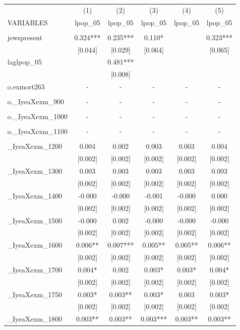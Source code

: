 \documentclass[landscape]{article}
\begin{document}
\begin{tabular}{lccccc} \hline
 & (1) & (2) & (3) & (4) & (5) \\
VARIABLES & lpop\_05 & lpop\_05 & lpop\_05 & lpop\_05 & lpop\_05 \\ \hline
 &  &  &  &  &  \\
jewspresent & 0.324*** & 0.235*** & 0.110* &  & 0.323*** \\
 & [0.044] & [0.029] & [0.064] &  & [0.065] \\
laglpop\_05 &  & 0.481*** &  &  &  \\
 &  & [0.008] &  &  &  \\
o.exmort263 & - & - & - & - & - \\
 &  &  &  &  &  \\
o.\_IyeaXexm\_900 & - & - & - & - & - \\
 &  &  &  &  &  \\
o.\_IyeaXexm\_1000 & - & - & - & - & - \\
 &  &  &  &  &  \\
o.\_IyeaXexm\_1100 & - & - & - & - & - \\
 &  &  &  &  &  \\
\_IyeaXexm\_1200 & 0.004 & 0.002 & 0.003 & 0.003 & 0.004 \\
 & [0.002] & [0.002] & [0.002] & [0.002] & [0.002] \\
\_IyeaXexm\_1300 & 0.003 & 0.003 & 0.003 & 0.003 & 0.003 \\
 & [0.002] & [0.002] & [0.002] & [0.002] & [0.002] \\
\_IyeaXexm\_1400 & -0.000 & -0.000 & -0.001 & -0.000 & 0.000 \\
 & [0.002] & [0.002] & [0.002] & [0.002] & [0.002] \\
\_IyeaXexm\_1500 & -0.000 & 0.002 & -0.000 & -0.000 & -0.000 \\
 & [0.002] & [0.002] & [0.002] & [0.002] & [0.002] \\
\_IyeaXexm\_1600 & 0.006** & 0.007*** & 0.005** & 0.005** & 0.006** \\
 & [0.002] & [0.002] & [0.002] & [0.002] & [0.002] \\
\_IyeaXexm\_1700 & 0.004* & 0.002 & 0.003* & 0.003* & 0.004* \\
 & [0.002] & [0.002] & [0.002] & [0.002] & [0.002] \\
\_IyeaXexm\_1750 & 0.003* & 0.003** & 0.003* & 0.003 & 0.003* \\
 & [0.002] & [0.002] & [0.002] & [0.002] & [0.002] \\
\_IyeaXexm\_1800 & 0.003** & 0.003** & 0.003*** & 0.003** & 0.003** \\

\end{tabular}
\end{document}

